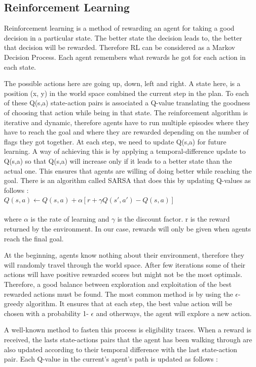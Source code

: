 \documentclass[letterpaper]{article}
\begin{document}
\subsection{Reinforcement Learning}
Reinforcement learning is a method of rewarding an agent for taking a good decision in a particular state. The better state the decision leads to, the better that decision will be rewarded. Therefore RL can be considered as a Markov Decision Process. Each agent remembers what rewards he got for each action in each state. 

The possible actions here are going up, down, left and right. A state here, is a position (x, y) in the world space combined the current step in the plan. To each of these Q(s,a) state-action pairs is associated a Q-value translating the goodness of choosing that action while being in that state. The reinforcement algorithm is iterative and dynamic, therefore agents have to run multiple episodes where they have to reach the goal and where they are rewarded depending on the number of flags they got together. At each step, we need to update Q(s,a)  for future learning. A way of achieving this is by applying a temporal-difference update to Q(s,a) so that Q(s,a) will increase only if it leads to a better state than the actual one. This ensures that agents are willing of doing better while reaching the goal. There is an algorithm called SARSA that does this by updating Q-values as follows : \\

$Q(s, a) \leftarrow  Q(s, a) +  \alpha [r + \gamma Q(s', a') - Q(s,a)]$\\\\
where $\alpha$ is the rate of learning and $\gamma$ is the discount factor. r is the reward returned by the environment. In our case, rewards will only be given when agents reach the final goal. 

At the beginning, agents know nothing about their environment, therefore they will randomly travel through the world space. After few iterations some of their actions will have positive rewarded scores but might not be the most optimals. Therefore, a good balance between exploration and exploitation of the best rewarded actions must be found. The most common method is by using the $\epsilon$-greedy algorithm. It ensures that at each step, the best value action will be chosen with a probability 1- $\epsilon$ and otherways, the agent will explore a new action.


A well-known method to fasten this process is eligibility traces. When a reward is received, the lasts state-actions pairs that the agent has been walking through are also updated according to their temporal difference with the last state-action pair. Each Q-value in the current's agent's path is updated as follows : \\
\end{document}
